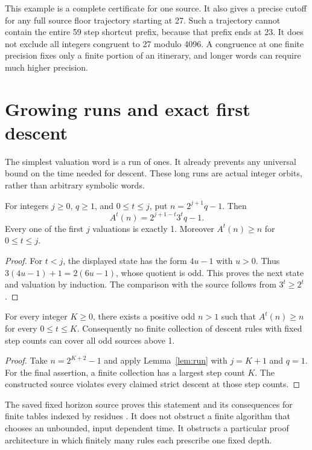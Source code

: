 This example is a complete certificate for one source. It also gives a precise cutoff for any full source floor trajectory starting at 27. Such a trajectory cannot contain the entire 59 step shortcut prefix, because that prefix ends at 23. It does not exclude all integers congruent to 27 modulo 4096. A congruence at one finite precision fixes only a finite portion of an itinerary, and longer words can require much higher precision.

\section{Growing runs and exact first descent}
The simplest valuation word is a run of ones. It already prevents any universal bound on the time needed for descent. These long runs are actual integer orbits, rather than arbitrary symbolic words.

\begin{lemma}\label{lem:run}
For integers $j\ge0$, $q\ge1$, and $0\le t\le j$, put $n=2^{j+1}q-1$. Then
\begin{equation}\label{eq:run}
A^t(n)=2^{j+1-t}3^t q-1.
\end{equation}
Every one of the first $j$ valuations is exactly 1. Moreover $A^t(n)\ge n$ for $0\le t\le j$.
\end{lemma}
\begin{proof}
For $t<j$, the displayed state has the form $4u-1$ with $u>0$. Thus $3(4u-1)+1=2(6u-1)$, whose quotient is odd. This proves the next state and valuation by induction. The comparison with the source follows from $3^t\ge2^t$.
\end{proof}

\begin{theorem}\label{thm:horizon}
For every integer $K\ge0$, there exists a positive odd $n>1$ such that $A^t(n)\ge n$ for every $0\le t\le K$. Consequently no finite collection of descent rules with fixed step counts can cover all odd sources above 1.
\end{theorem}
\begin{proof}
Take $n=2^{K+2}-1$ and apply Lemma~\ref{lem:run} with $j=K+1$ and $q=1$. For the final assertion, a finite collection has a largest step count $K$. The constructed source violates every claimed strict descent at those step counts.
\end{proof}

The saved fixed horizon source proves this statement and its consequences for finite tables indexed by residues \cite{projectcollatzhorizon}. It does not obstruct a finite algorithm that chooses an unbounded, input dependent time. It obstructs a particular proof architecture in which finitely many rules each prescribe one fixed depth.

